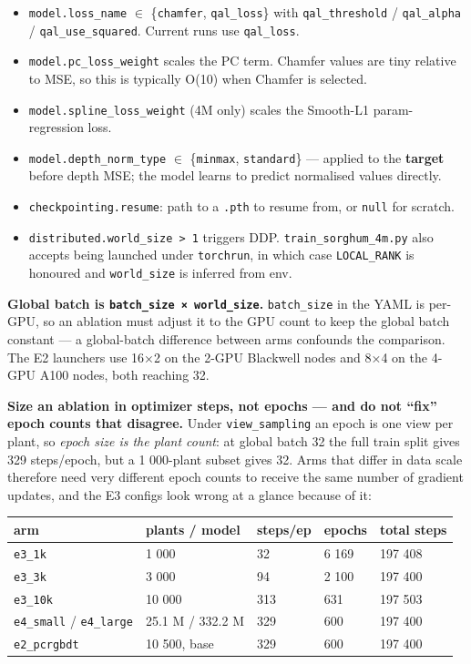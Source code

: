 \documentclass[
  10pt,
]{article}
\newcounter{none} %
\begin{document}
\begin{itemize}
  varies; everything else stays fixed.
\item
  \texttt{model.loss\_name} \(\in\) \{\texttt{chamfer},
  \texttt{qal\_loss}\} with \texttt{qal\_threshold} /
  \texttt{qal\_alpha} / \texttt{qal\_use\_squared}. Current runs use
  \texttt{qal\_loss}.
\item
  \texttt{model.pc\_loss\_weight} scales the PC term. Chamfer values are
  tiny relative to MSE, so this is typically O(10) when Chamfer is
  selected.
\item
  \texttt{model.spline\_loss\_weight} (4M only) scales the Smooth-L1
  param-regression loss.
\item
  \texttt{model.depth\_norm\_type} \(\in\) \{\texttt{minmax},
  \texttt{standard}\} --- applied to the \textbf{target} before depth
  MSE; the model learns to predict normalised values directly.
\item
  \texttt{checkpointing.resume}: path to a \texttt{.pth} to resume from,
  or \texttt{null} for scratch.
\item
  \texttt{distributed.world\_size\ \textgreater{}\ 1} triggers DDP.
  \texttt{train\_sorghum\_4m.py} also accepts being launched under
  \texttt{torchrun}, in which case \texttt{LOCAL\_RANK} is honoured and
  \texttt{world\_size} is inferred from env.
\end{itemize}

\textbf{Global batch is \texttt{batch\_size\ ×\ world\_size}.}
\texttt{batch\_size} in the YAML is per-GPU, so an ablation must adjust
it to the GPU count to keep the global batch constant --- a global-batch
difference between arms confounds the comparison. The E2 launchers use
16×2 on the 2-GPU Blackwell nodes and 8×4 on the 4-GPU A100 nodes, both
reaching 32.

\textbf{Size an ablation in optimizer steps, not epochs --- and do not
``fix'' epoch counts that disagree.} Under \texttt{view\_sampling} an
epoch is one view per plant, so \emph{epoch size is the plant count}: at
global batch 32 the full train split gives 329 steps/epoch, but a 1
000-plant subset gives 32. Arms that differ in data scale therefore need
very different epoch counts to receive the same number of gradient
updates, and the E3 configs look wrong at a glance because of it:

{\def\LTcaptype{none} %
\begin{longtable}[]{@{}lllll@{}}
\toprule\noalign{}
arm & plants / model & steps/ep & epochs & total steps \\
\midrule\noalign{}
\endhead
\bottomrule\noalign{}
\endlastfoot
\texttt{e3\_1k} & 1 000 & 32 & 6 169 & 197 408 \\
\texttt{e3\_3k} & 3 000 & 94 & 2 100 & 197 400 \\
\texttt{e3\_10k} & 10 000 & 313 & 631 & 197 503 \\
\texttt{e4\_small} / \texttt{e4\_large} & 25.1 M / 332.2 M & 329 & 600 &
197 400 \\
\texttt{e2\_pcrgbdt} & 10 500, base & 329 & 600 & 197 400 \\
\end{longtable}
}
\end{document}
